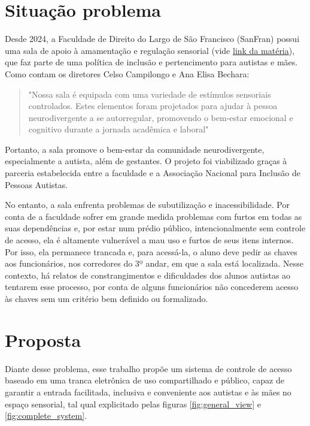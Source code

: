 \documentclass[12pt, letterpaper, twoside]{article}
\begin{document}
\section{Situação problema}
Desde 2024, a Faculdade de Direito do Largo de São Francisco (SanFran) possui uma sala de apoio à amamentação e regulação sensorial (vide \href{https://direito.usp.br/noticia/e59450c2bb90-fdusp-tera-sala-de-apoio-a-amamentacao-e-de-regulacao-sensorial}{link da matéria}), que faz parte de uma política de inclusão e pertencimento para autistas e mães. Como contam os diretores Celso Campilongo e Ana Elisa Bechara:

\begin{quote}
    "Nossa sala é equipada com uma variedade de estímulos sensoriais controlados. Estes elementos foram projetados para ajudar à pessoa neurodivergente a se autorregular, promovendo o bem-estar emocional e cognitivo durante a jornada acadêmica e laboral"
\end{quote}

Portanto, a sala promove o bem-estar da comunidade neurodivergente, especialmente a autista, além de gestantes. O projeto foi viabilizado graças à parceria estabelecida entre a faculdade e a Associação Nacional para Inclusão de Pessoas Autistas.

No entanto, a sala enfrenta problemas de subutilização e inacessibilidade. Por conta de a faculdade sofrer em grande medida problemas com furtos em todas as suas dependências e, por estar num prédio público, intencionalmente sem controle de acesso, ela é altamente vulnerável a mau uso e furtos de seus itens internos. Por isso, ela permanece trancada e, para acessá-la, o aluno deve pedir as chaves aos funcionários, nos corredores do 3º andar, em que a sala está localizada. Nesse contexto, há relatos de constrangimentos e dificuldades dos alunos autistas ao tentarem esse processo, por conta de alguns funcionários não concederem acesso às chaves sem um critério bem definido ou formalizado.

\section{Proposta}
Diante desse problema, esse trabalho propõe um sistema de controle de acesso baseado em uma tranca eletrônica de uso compartilhado e público, capaz de garantir a entrada facilitada, inclusiva e conveniente aos autistas e às mães no espaço sensorial, tal qual explicitado pelas figuras \ref{fig:general_view} e \ref{fig:complete_system}.
\end{document}
